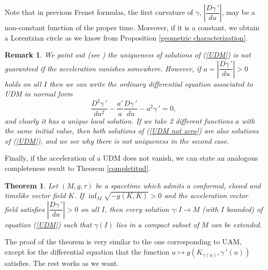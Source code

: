 \documentclass[11pt]{book}
\newtheorem{theor}[defi]{Theorem}
\newtheorem{rem}[defi]{Remark}
\begin{document}
Note that in previous Frenet formulas, the first curvature of $\gamma$, $\left|\dfrac{D\gamma{\,'}}{du}\right|$, may be a non-constant function of the proper time. Moreover, if it is a constant, we obtain a Lorentzian circle as we know from Proposition \ref{geometric characterization}.

\begin{rem}
	{\rm
		We point out (see \cite{UDM}) the uniqueness of solutions of {\rm (\ref{UDM})} is not guaranteed if the acceleration vanishes somewhere. However, if $a=\left|\dfrac{D\gamma{\,'}}{du}\right|>0$ holds on all $I$ then we can write the ordinary differential equation associated to UDM in normal form 
		\begin{equation}\label{UDM not zero}
			\frac{D^2 \gamma\,'}{du^2} - \frac{a'}{a} \frac{D\gamma\,'}{du} - a^2 \gamma\,'=0,
		\end{equation}
		and clearly it has a unique local solution. If we take 2 different functions $a$ with the same initial value, then both solutions of (\ref{UDM not zero}) are also solutions of (\ref{UDM}), and we see why there is not uniqueness in the second case.
}
\end{rem}

Finally, if the acceleration of a UDM does not vanish, we can state an analogous completeness result to Theorem \ref{completitud}.

\begin{theor}
	Let $(M,g,\tau)$ be a spacetime which admits a conformal, closed and timelike vector field $K$. If $\inf_M\sqrt{-g(K,K)}>0$ and the acceleration vector field satisfies $\left|\dfrac{D\gamma\,'}{du}\right|>0$ on all $I$, then every solution $\gamma:I\to M$ (with $I$ bounded) of equation {\rm (\ref{UDM})} such that $\gamma(I)$ lies in a compact subset of $M$ can be extended.
\end{theor}

The proof of the theorem is very similar to the one corresponding to UAM, except for the differential equation that the function $u\longmapsto g(K_{\gamma(u)}, \gamma{\,'}(u))$ satisfies. The rest works as we want.
\end{document}
